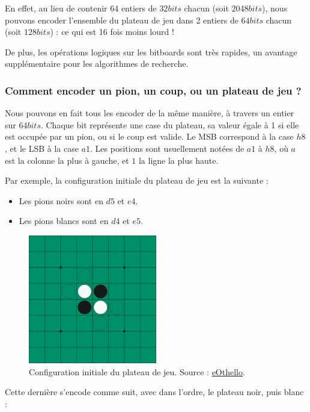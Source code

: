 En effet, au lieu de contenir 64 entiers de $32 bits$ chacun (soit $2048 bits$), nous pouvons encoder l'ensemble du plateau de jeu dans 2 entiers de $64 bits$ chacun (soit $128bits$) : ce qui est 16 fois moins lourd ! 

De plus, les opérations logiques sur les bitboards sont très rapides, un avantage supplémentaire pour les algorithmes de recherche.

\subsubsection{Comment encoder un pion, un coup, ou un plateau de jeu ?}
\label{subsubsec:enc}
Nous pouvons en fait tous les encoder de la même manière, à travers un entier sur $64bits$. Chaque bit représente une case du plateau, sa valeur égale à 1 si elle est occupée par un pion, ou si le coup est valide. Le \ac{MSB} correspond à la case $h8$, et le \ac{LSB} à la case $a1$. Les positions sont usuellement notées de $a1$ à $h8$, où $a$ est la colonne la plus à gauche, et $1$ la ligne la plus haute. \cite{brian_rose_2005} 

Par exemple, la configuration initiale du plateau de jeu est la suivante :
\begin{itemize}
    \item Les pions noirs sont en $d5$ et $e4$.
    \item Les pions blancs sont en $d4$ et $e5$.
\end{itemize}

\begin{figure}[H]
    \centering
    \includegraphics[width=0.5\textwidth]{ressources/plateau_init.png}
    \caption{Configuration initiale du plateau de jeu. Source : \href{https://www.eothello.com/}{eOthello}.}
    \label{fig:init_board}
\end{figure}

Cette dernière s'encode comme suit, avec dans l'ordre, le plateau noir, puis blanc :

